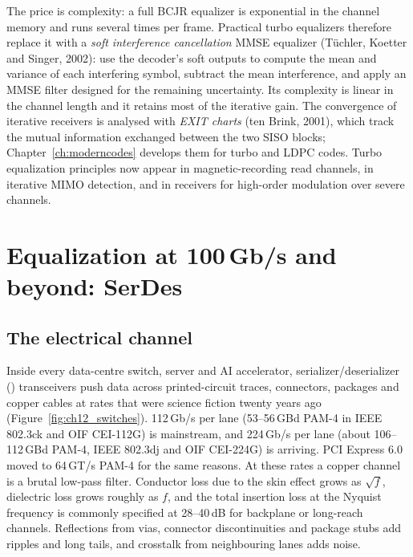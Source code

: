 
The price is complexity: a full BCJR equalizer is exponential in the channel memory and runs several
times per frame. Practical turbo equalizers therefore replace it with a \emph{soft interference
cancellation} MMSE equalizer (Tüchler, Koetter and Singer, 2002): use the decoder's soft outputs to
compute the mean and variance of each interfering symbol, subtract the mean interference, and apply an
MMSE filter designed for the remaining uncertainty. Its complexity is linear in the channel length and
it retains most of the iterative gain. The convergence of iterative receivers is analysed with
\emph{EXIT charts} (ten Brink, 2001), which track the mutual information exchanged between the two SISO
blocks; Chapter~\ref{ch:moderncodes} develops them for turbo and LDPC codes. Turbo equalization
principles now appear in magnetic-recording read channels, in iterative MIMO detection, and in
receivers for high-order modulation over severe channels.

\section{Equalization at 100\,Gb/s and beyond: SerDes}
\label{sec:ch12:serdes}


\subsection{The electrical channel}

Inside every data-centre switch, server and AI accelerator, serializer/deserializer ()
transceivers push data across printed-circuit traces, connectors, packages and copper cables at rates
that were science fiction twenty years ago (Figure~\ref{fig:ch12_switches}). 112\,Gb/s per lane
(53--56\,GBd PAM-4 in IEEE 802.3ck and OIF CEI-112G) is mainstream, and 224\,Gb/s per lane (about
106--112\,GBd PAM-4, IEEE 802.3dj and OIF CEI-224G) is arriving. PCI Express 6.0 moved to 64\,GT/s
PAM-4 for the same reasons. At these rates a copper channel is a brutal low-pass filter. Conductor
loss due to the skin effect grows as $\sqrt f$, dielectric loss grows roughly as $f$, and the total
insertion loss at the Nyquist frequency is commonly specified at 28--40\,dB for backplane or
long-reach channels. Reflections from vias, connector discontinuities and package stubs add ripples
and long tails, and crosstalk from neighbouring lanes adds noise.

